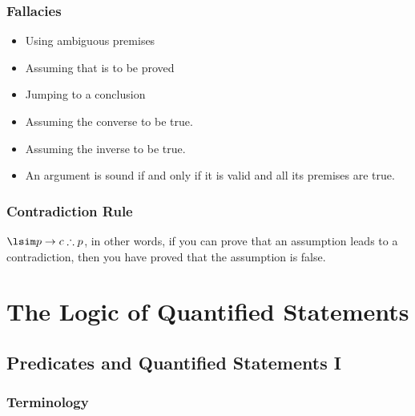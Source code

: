 \documentclass[a4paper]{report}
\begin{document}
\subsection{Fallacies}

\begin{itemize}
    \item Using ambiguous premises
    \item Assuming that is to be proved
    \item Jumping to a conclusion
    \item Assuming the converse to be true.
    \item Assuming the inverse to be true.
    \item An argument is sound if and only if it is valid and all its premises are true.
\end{itemize}

\subsection{Contradiction Rule}

$\lsim p \to c \therefore p$, in other words, if you can prove that an assumption leads to a contradiction, then you have proved that the assumption is false.

\chapter{The Logic of Quantified Statements}

\section{Predicates and Quantified Statements I}

\subsection{Terminology}
\end{document}
